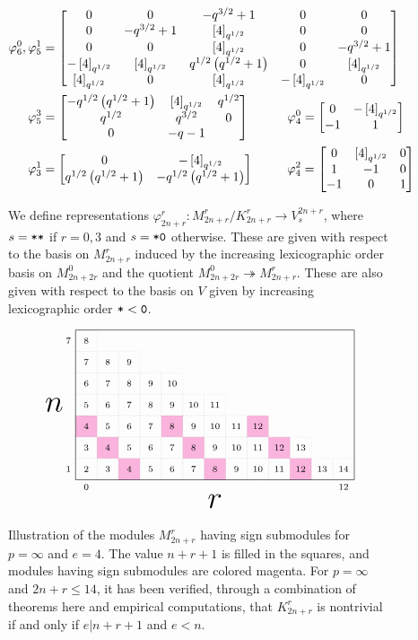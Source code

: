\documentclass{amsart}
\begin{document}
\begin{figure}
\def\tho{q^{3/2} + 1}
\def\tht{\brk{4}_{q^{1/2}}}
\def\to{q^{1/2}\prn{q^{1/2} + 1}}
\begin{align*}
  \varphi_6^0, \varphi_5^1 &= \begin{bmatrix}
    0 & 0 & -\tho & 0 & 0\\
    0 & -\tho & \tht & 0 & 0\\
    0 & 0 & \tht & 0 & -\tho\\
    -\tht & \tht & \to & 0 & \tht\\
    \tht & 0 & \tht & -\tht & 0
  \end{bmatrix}\\
  \varphi_5^3 &= \begin{bmatrix}
    -\to & \tht & q^{1/2}\\
    q^{1/2} & q^{3/2} & 0\\
    0 & -q - 1
  \end{bmatrix}  \hspace{30pt} 
  \varphi_4^0 = \begin{bmatrix}
    0 & -\tht\\
    -1 & 1
  \end{bmatrix}\\
  \varphi_3^1 &= \begin{bmatrix}
    0 & -\tht\\
    \to & -\to
  \end{bmatrix} \hspace{27pt}
  \varphi_4^2 = \begin{bmatrix}
    0 & \tht & 0\\
    1 & -1 & 0\\
    -1 & 0 & 1
  \end{bmatrix}
\end{align*}
\caption{We define representations $\varphi_{2n + r}^r:M_{2n + r}^r/K_{2n + r}^r \rightarrow V^{2n + r}_{s}$, where $s = \texttt{*}\texttt{*}$ if $r = 0,3$ and $s = \texttt{*}\texttt{0}$ otherwise.
These are given with respect to the basis on $M_{2n + r}^r$ induced by the increasing lexicographic order basis on $M_{2n + 2r}^0$ and the quotient $M_{2n + 2r}^0 \twoheadrightarrow M_{2n + r}^r$.
These are also given with respect to the basis on $V$ given by increasing lexicographic order $\texttt{*} < \texttt{0}$.
  }\label{Fib Data}
\end{figure}

\begin{figure}
  \[
    \ENRGrid{13/7}{3/1,7/1,11/1,2/2,6/2,10/2,1/3,5/3,9/3}
  \]
  \caption{
    Illustration of the modules $M_{2n + r}^r$ having sign submodules for $p = \infty$ and $e = 4$.
    The value $n + r + 1$ is filled in the squares, and modules having sign submodules are colored magenta.
    For $p = \infty$ and $2n + r \leq 14$, it has been verified, through a combination of theorems here and empirical computations, that $K_{2n + r}^r$ is nontrivial if and only if $e | n+r+1$ and $e < n$.
  }\label{Empirical Kernel}
\end{figure}
\end{document}
